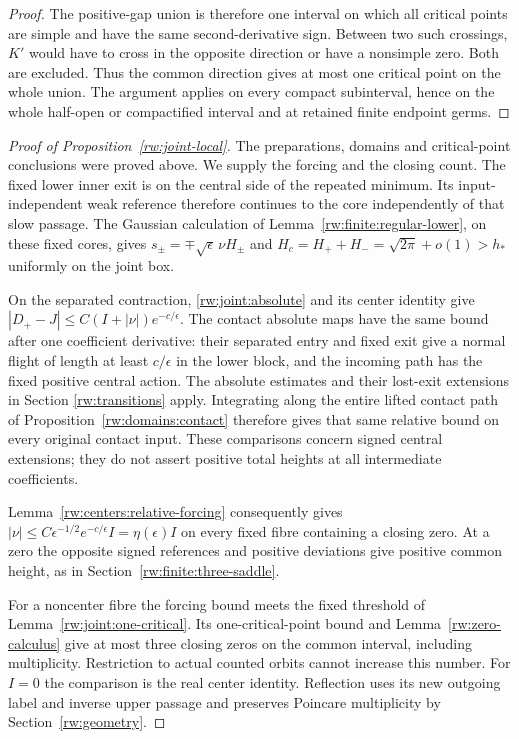 \begin{proof}
The positive-gap union is therefore one interval on which all critical
points are simple and have the same second-derivative sign. Between
two such crossings, $K'$ would have to cross in the opposite direction
or have a nonsimple zero. Both are excluded. Thus the common direction
gives at most one critical point on the whole union.
The argument applies on every compact subinterval, hence on the
whole half-open or compactified interval and at retained finite
endpoint germs.
\end{proof}

\begin{proof}[Proof of Proposition~\ref{rw:joint-local}]
The preparations, domains and critical-point conclusions were proved
above. We supply the forcing and the closing count.
The fixed lower inner exit is on the central side of the repeated
minimum. Its input-independent weak reference therefore continues to
the core independently of that slow passage. The Gaussian calculation
of Lemma~\ref{rw:finite:regular-lower}, on these fixed cores, gives
$s_\pm=\mp\sqrt\epsilon\,\nu H_\pm$ and
$H_c=H_++H_-=\sqrt{2\pi}+o(1)>h_*$ uniformly on the joint box.

On the separated contraction, \eqref{rw:joint:absolute} and its
center identity give
$|D_+-J|\le C(I+|\nu|)e^{-c/\epsilon}$.
The contact absolute maps have the same bound after one coefficient
derivative: their separated entry and fixed exit give a normal
flight of length at least $c/\epsilon$ in the lower block, and
the incoming path has the fixed positive central action.
The absolute estimates and their lost-exit extensions in Section
\ref{rw:transitions} apply. Integrating along the entire lifted
contact path of Proposition~\ref{rw:domains:contact} therefore
gives that same relative bound on every original contact input.
These comparisons concern signed central extensions; they do not
assert positive total heights at all intermediate coefficients.

Lemma~\ref{rw:centers:relative-forcing} consequently gives
$|\nu|\le C\epsilon^{-1/2}e^{-c/\epsilon}I=\eta(\epsilon)I$
on every fixed fibre containing a closing zero.
At a zero the opposite signed references and positive deviations give
positive common height, as in Section~\ref{rw:finite:three-saddle}.

For a noncenter fibre the forcing bound meets the fixed threshold of
Lemma~\ref{rw:joint:one-critical}. Its one-critical-point bound and
Lemma~\ref{rw:zero-calculus} give at most three closing zeros on the
common interval, including multiplicity. Restriction to actual counted
orbits cannot increase this number. For $I=0$ the comparison is the
real center identity. Reflection uses its new outgoing label and inverse
upper passage and preserves Poincare multiplicity by Section~\ref{rw:geometry}.
\end{proof}
